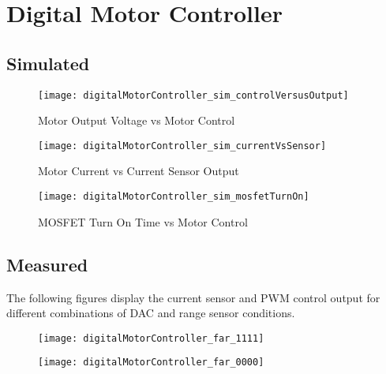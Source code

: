 \graphicspath{{content/3_results/figures}}
\section{Digital Motor Controller}

\subsection{Simulated}

\begin{figure}[!htb]
  \centering
  \texttt{[image: digitalMotorController\_sim\_controlVersusOutput]}
  \caption{Motor Output Voltage vs Motor Control}
  \label{fig:digitalMotorController_sim_controlVersusOutput}
\end{figure}

\begin{figure}[!htb]
  \centering
  \texttt{[image: digitalMotorController\_sim\_currentVsSensor]}
  \caption{Motor Current vs Current Sensor Output}
  \label{fig:digitalMotorController_sim_currentVsSensor}
\end{figure}

\begin{figure}[!htb]
    \centering
    \texttt{[image: digitalMotorController\_sim\_mosfetTurnOn]}
    \caption{MOSFET Turn On Time vs Motor Control}
    \label{fig:digitalMotorController_sim_mosfetTurnOn}
\end{figure}

\pagebreak

\subsection{Measured}

The following figures display the current sensor and PWM control output for different combinations of DAC and range sensor conditions.

\begin{figure}[!htb]
    \centering
    \begin{minipage}{.45\textwidth}
        \centering
        \texttt{[image: digitalMotorController\_far\_1111]}
        \label{fig:digitalMotorController_far_1111}
    \end{minipage}
    \begin{minipage}{.45\textwidth}
        \centering
        \texttt{[image: digitalMotorController\_far\_0000]}
        \label{fig:digitalMotorController_far_0000}
    \end{minipage}
\end{figure}

